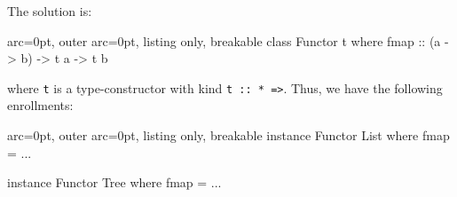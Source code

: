 The solution is:

\begin{tcblisting}{ arc=0pt, outer arc=0pt, listing only, breakable}
class Functor t where
   fmap :: (a -> b) -> t a -> t b

\end{tcblisting}

where \texttt{t} is a type-constructor with kind \texttt{t :: * =\textgreater  *}. Thus, we have the following enrollments:


\begin{tcblisting}{ arc=0pt, outer arc=0pt, listing only, breakable}
instance Functor List where
  fmap = ...

instance Functor Tree where
  fmap = ...

\end{tcblisting}

